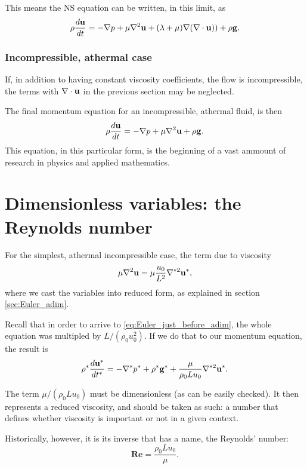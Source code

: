 This means the NS equation can be written, in this limit,
as
\begin{equation}
  \label{eq:NS_const_viscs}
  \rho \frac{d\mathbf{u} }{dt} =
  - \nabla p +
   \mu \nabla^2  \mathbf{u}
  + ( \lambda  + \mu) \nabla ( \nabla\cdot\mathbf{u} ) )
  + \rho \mathbf{g} .
\end{equation}





\subsubsection{Incompressible, athermal case}

If, in addition to having constant viscosity coefficients, the flow is
incompressible, the terms with $\nabla\cdot\mathbf{u}$ in the previous section may be
neglected.

The final momentum equation for an incompressible, athermal fluid, is
then
\begin{equation}
  \label{eq:NS_usual}
  \rho \frac{d\mathbf{u} }{dt} =
  - \nabla p 
  + \mu \nabla^2 \mathbf{u}
  + \rho \mathbf{g} .
\end{equation}
This equation, in this particular form, is the beginning of a vast
ammount of research in physics and applied mathematics.





\section{Dimensionless variables: the Reynolds number}

For the simplest, athermal incompressible case, the term due to
viscosity
\[
\mu \nabla^2 \mathbf{u} = \mu \frac{u_0}{L^2} \nabla^{*2} \mathbf{u}^* ,
\]
where we cast the variables into reduced form, as explained in
section \ref{sec:Euler_adim}.

Recall that in order to arrive to \ref{eq:Euler_just_before_adim}, the
whole equation was multipled by $L/(\rho_0 u_0^2)$. If we do that to our
momentum equation, the result is
\[
\rho^* \frac{d\mathbf{u}^* }{dt^* } =
-  \nabla^* p^*
+  \rho^* \mathbf{g}^* +
\frac{\mu }{\rho_ 0 L u_0 } \nabla^{*2} \mathbf{u}^* .
\]

The term $\mu /( \rho_ 0 L u_0)$ must be dimensionless (as can be
easily checked). It then represents a reduced viscosity, and should be
taken as such: a number that defines whether viscosity is important or
not in a given context.

Historically, however, it is its inverse that has a name, the
Reynolds' number:
\begin{equation}
  \mathbf{Re}= \frac{\rho_ 0 L u_0 }{\mu }.
\end{equation}

